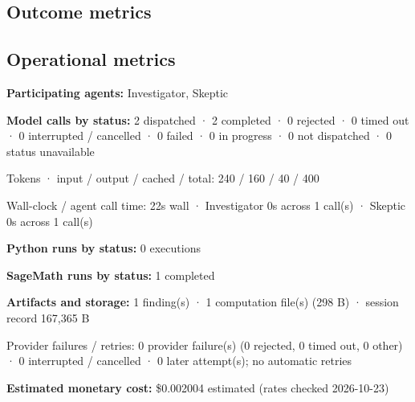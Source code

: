\documentclass[11pt]{article}
\begin{document}
\subsection{Outcome metrics}
\subsection{Operational metrics}
\textbf{Participating agents:} Investigator, Skeptic\par
\textbf{Model calls by status:} 2 dispatched · 2 completed · 0 rejected · 0 timed out · 0 interrupted / cancelled · 0 failed · 0 in progress · 0 not dispatched · 0 status unavailable\par
Tokens · input / output / cached / total: 240 / 160 / 40 / 400\par
Wall-clock / agent call time: 22s wall · Investigator 0s across 1 call(s) · Skeptic 0s across 1 call(s)\par
\textbf{Python runs by status:} 0 executions\par
\textbf{SageMath runs by status:} 1 completed\par
\textbf{Artifacts and storage:} 1 finding(s) · 1 computation file(s) (298 B) · session record 167,365 B\par
Provider failures / retries: 0 provider failure(s) (0 rejected, 0 timed out, 0 other) · 0 interrupted / cancelled · 0 later attempt(s); no automatic retries\par
\textbf{Estimated monetary cost:} \$0.002004 estimated (rates checked 2026-10-23)\par
\end{document}
